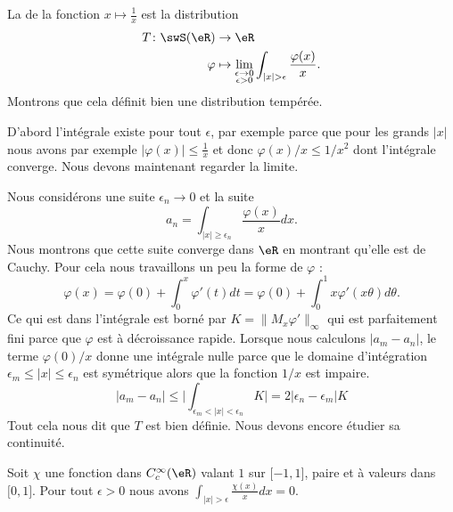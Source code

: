 \begin{example}
	La  de la fonction \( x\mapsto \frac{1}{ x }\) est la distribution
	\begin{equation}
		\begin{aligned}
			T\colon \swS(\eR) & \to \eR                               \\
			\varphi           & \mapsto \lim_{\substack{\epsilon\to 0 \\\epsilon>0}}\int_{| x |>\epsilon}\frac{ \varphi(x) }{ x }.
		\end{aligned}
	\end{equation}
	Montrons que cela définit bien une distribution tempérée.

	D'abord l'intégrale existe pour tout \( \epsilon\), par exemple parce que pour les grands \( | x |\) nous avons par exemple \( | \varphi(x)|\leq \frac{1}{ x}\) et donc \( \varphi(x)/x\leq 1/x^2\) dont l'intégrale converge. Nous devons maintenant regarder la limite.

	Nous considérons une suite \( \epsilon_n\to 0\) et la suite
	\begin{equation}
		a_n=\int_{| x |\geq \epsilon_n}\frac{ \varphi(x) }{ x }dx.
	\end{equation}
	Nous montrons que cette suite converge dans \( \eR\) en montrant qu'elle est de Cauchy. Pour cela nous travaillons un peu la forme de \( \varphi\) :
	\begin{equation}
		\varphi(x)=\varphi(0)+\int_0^x\varphi'(t)dt=\varphi(0)+\int_0^1x\varphi'(x\theta)d\theta.
	\end{equation}
	Ce qui est dans l'intégrale est borné par \( K=\| M_x\varphi' \|_{\infty}\) qui est parfaitement fini parce que \( \varphi\) est à décroissance rapide. Lorsque nous calculons \( | a_m-a_n |\), le terme \( \varphi(0)/x\) donne une intégrale nulle parce que le domaine d'intégration \( \epsilon_m\leq | x |\leq \epsilon_n\) est symétrique alors que la fonction \( 1/x\) est impaire.
	\begin{equation}
		| a_m-a_n |\leq \big| \int_{\epsilon_m<| x |<\epsilon_n}K \big|=2| \epsilon_n-\epsilon_m |K
	\end{equation}
	Tout cela nous dit que \( T\) est bien définie. Nous devons encore étudier sa continuité.

	Soit \( \chi\) une fonction dans \(  C^{\infty}_c(\eR)\) valant \( 1\) sur \( \mathopen[ -1 , 1 \mathclose]\), paire et à valeurs dans \( \mathopen[ 0 , 1 \mathclose]\).
	Pour tout \( \epsilon>0\) nous avons \( \int_{| x |>\epsilon}\frac{ \chi(x) }{ x }dx=0\).


\end{example}
